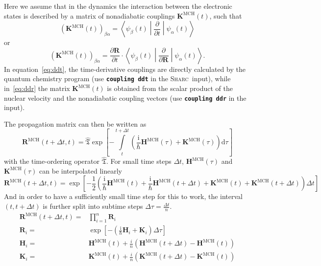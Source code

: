 \documentclass[a4paper,10pt,DIV=15,openany,twoside=false]{scrbook}
\newcommand{\sharc}{\textsc{Sharc}}
\newcommand{\ttt}[1]{\textbf{\texttt{#1}}}
\newcommand{\I}{\ensuremath{\mathrm{i}}}
\newcommand{\D}{\ensuremath{\mathrm{d}}}
\newcommand{\VEC}[1]{\ensuremath{\mathbf{#1}}}
\begin{document}
Here we assume that in the dynamics the interaction between the electronic states is described by a matrix of nonadiabatic couplings $\VEC{K}^{\text{MCH}}(t)$, such that
\begin{equation}
  \left(\VEC{K}^{\text{MCH}}(t)\right)_{\beta\alpha}
  =
  \left\langle
    \psi_\beta(t)
  \middle|
    \frac{\partial}{\partial t}
  \middle|
    \psi_\alpha(t)
  \right\rangle
  \label{eq:ddt}
\end{equation}
or
\begin{equation}
  \left(\VEC{K}^{\text{MCH}}(t)\right)_{\beta\alpha}
  =
  \frac{\partial \VEC{R}}{\partial t}\cdot
  \left\langle
    \psi_\beta(t)
  \middle|
    \frac{\partial}{\partial \VEC{R}}
  \middle|
    \psi_\alpha(t)
  \right\rangle.
  \label{eq:ddr}
\end{equation}
In equation~\eqref{eq:ddt}, the time-derivative couplings are directly calculated by the quantum chemistry program (use \ttt{coupling ddt} in the \sharc\ input), while in~\eqref{eq:ddr} the matrix $\VEC{K}^{\text{MCH}}(t)$ is obtained from the scalar product of the nuclear velocity and the nonadiabatic coupling vectors (use \ttt{coupling ddr} in the input).

The propagation matrix can then be written as 
\begin{equation}
  \VEC{R}^{\text{MCH}}(t+\Delta t,t)=
  \hat{\mathfrak{T}}
  \exp\left[
    -\int\limits_{t}^{t+\Delta t}
    \left(
      \frac{\I}{\hbar}\VEC{H}^{\text{MCH}}(\tau)+\VEC{K}^{\text{MCH}}(\tau) 
    \right)\D\tau
  \right]
\end{equation}
with the time-ordering operator $\hat{\mathfrak{T}}$. For small time steps $\Delta t$, $\VEC{H}^{\text{MCH}}(\tau)$ and $\VEC{K}^{\text{MCH}}(\tau)$ can be interpolated linearly
\begin{equation}
  \VEC{R}^{\text{MCH}}(t+\Delta t,t)=
  \exp\left[
    -\frac{1}{2}\left(
      \frac{\I}{\hbar}\VEC{H}^{\text{MCH}}(t)+\frac{\I}{\hbar}\VEC{H}^{\text{MCH}}(t+\Delta t)
      +\VEC{K}^{\text{MCH}}(t)+\VEC{K}^{\text{MCH}}(t+\Delta t)
    \right)\Delta t
  \right]
\end{equation}
And in order to have a sufficiently small time step for this to work, the interval $(t,t+\Delta t)$ is further split into subtime steps $\Delta\tau=\frac{\Delta t}{n}$. 
\begin{align}
  \VEC{R}^{\text{MCH}}(t+\Delta t,t)=&
  \prod\limits_{i=1}^{n}
  \VEC{R}_i\\
  \VEC{R}_i=&
  \exp\left[
      -\left(
        \frac{\I}{\hbar}\VEC{H}_i
        +\VEC{K}_i
      \right)\Delta\tau
  \right]\\
  \VEC{H}_i=&
  \VEC{H}^{\text{MCH}}(t) + \frac{i}{n}
  \left(
    \VEC{H}^{\text{MCH}}(t+\Delta t)-\VEC{H}^{\text{MCH}}(t)
  \right)\label{eq:ham_propn}\\
  \VEC{K}_i=&
  \VEC{K}^{\text{MCH}}(t) + \frac{i}{n}
  \left(
    \VEC{K}^{\text{MCH}}(t+\Delta t)-\VEC{K}^{\text{MCH}}(t)
  \right)
\end{align}
\end{document}
